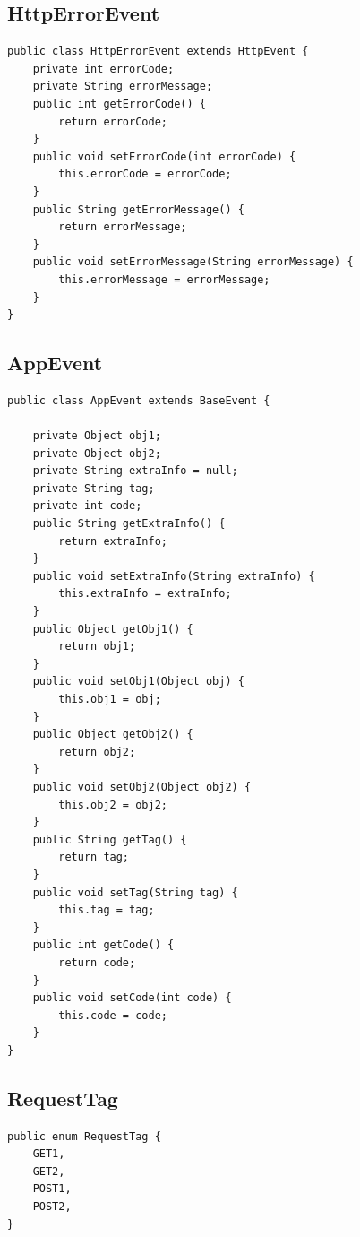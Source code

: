 \documentclass[9pt, b5paper]{article}
\begin{document}
\subsection{HttpErrorEvent}
\label{sec-4-4}
\begin{verbatim}
public class HttpErrorEvent extends HttpEvent {
    private int errorCode;
    private String errorMessage;
    public int getErrorCode() {
        return errorCode;
    }
    public void setErrorCode(int errorCode) {
        this.errorCode = errorCode;
    }
    public String getErrorMessage() {
        return errorMessage;
    }
    public void setErrorMessage(String errorMessage) {
        this.errorMessage = errorMessage;
    }
}
\end{verbatim}
\subsection{AppEvent}
\label{sec-4-5}
\begin{verbatim}
public class AppEvent extends BaseEvent {

    private Object obj1;
    private Object obj2;
    private String extraInfo = null;
    private String tag;
    private int code;
    public String getExtraInfo() {
        return extraInfo;
    }
    public void setExtraInfo(String extraInfo) {
        this.extraInfo = extraInfo;
    }
    public Object getObj1() {
        return obj1;
    }
    public void setObj1(Object obj) {
        this.obj1 = obj;
    }
    public Object getObj2() {
        return obj2;
    }
    public void setObj2(Object obj2) {
        this.obj2 = obj2;
    }
    public String getTag() {
        return tag;
    }
    public void setTag(String tag) {
        this.tag = tag;
    }
    public int getCode() {
        return code;
    }
    public void setCode(int code) {
        this.code = code;
    }
}
\end{verbatim}
\subsection{RequestTag}
\label{sec-4-6}
\begin{verbatim}
public enum RequestTag {
    GET1,
    GET2,
    POST1,
    POST2,
}
\end{verbatim}
\end{document}
